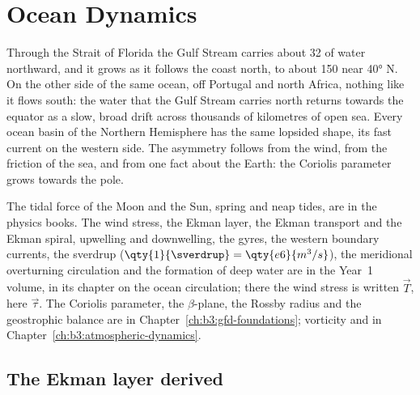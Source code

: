 \chapter{Ocean Dynamics}\label{ch:b3:ocean-dynamics}

Through the Strait of Florida the Gulf Stream carries about
\qty{32}{\sverdrup} of water northward, and it grows as it follows the coast
north, to about \qty{150}{\sverdrup} near \ang{40} N. On the other side of the same ocean, off Portugal and north
Africa, nothing like it flows south: the water that the Gulf Stream carries
north returns towards the equator as a slow, broad drift across thousands
of kilometres of open sea. Every ocean basin of the Northern Hemisphere has
the same lopsided shape, its fast current on the western side. The
asymmetry follows from the wind, from the friction of the sea, and from one
fact about the Earth: the Coriolis parameter grows towards the pole.

\begin{recall}
The tidal force of the Moon and the Sun, spring and neap tides, are in the
physics books. The wind stress, the Ekman layer, the Ekman transport and
the Ekman spiral, upwelling and downwelling, the gyres, the western
boundary currents, the sverdrup ($\qty{1}{\sverdrup} =
\qty{e6}{m^3/s}$), the meridional overturning circulation and the
formation of deep water are in the Year~1 volume, in its chapter on the
ocean circulation; there the wind stress is written $\vec T$, here
$\vec\tau$. The Coriolis parameter, the $\beta$-plane, the Rossby radius
and the geostrophic balance are in Chapter~\ref{ch:b3:gfd-foundations};
vorticity and  in Chapter~\ref{ch:b3:atmospheric-dynamics}.
\end{recall}

\section{The Ekman layer derived}\label{sec:b3:ocean-dynamics:ekman}

